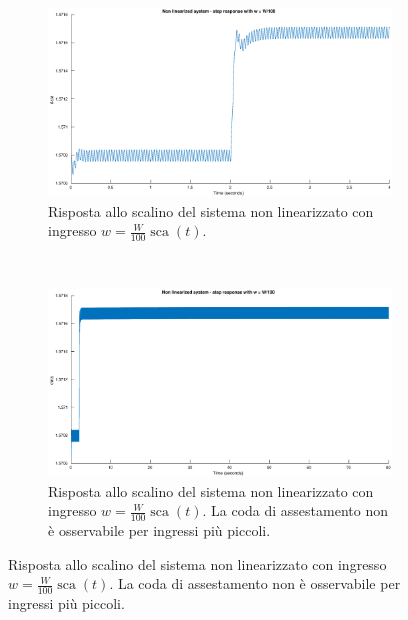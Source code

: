 \documentclass[a4paper]{article}
\DeclareMathOperator*{\sca}{\textrm{sca}}
\begin{document}
\begin{figure}[h]
\centering
\begin{subfigure}[t]{0.48\textwidth}
    \centering
    \includegraphics[width=\textwidth]{step_small_nonlin_short}
    \caption{Risposta allo scalino del sistema non linearizzato con ingresso $w = \frac{W}{100} \sca (t)$.}
    \label{fig:step_small_sim_nonlin_short}
\end{subfigure}
~
\begin{subfigure}[t]{0.48\textwidth}
    \centering
    \includegraphics[width=\textwidth]{step_small_nonlin_long}
    \caption{Risposta allo scalino del sistema non linearizzato con ingresso $w = \frac{W}{100} \sca (t)$. La coda di assestamento non è osservabile per ingressi più piccoli.}
    \label{fig:step_small_sim_nonlin_long}
\end{subfigure}
\end{figure}
\end{document}
